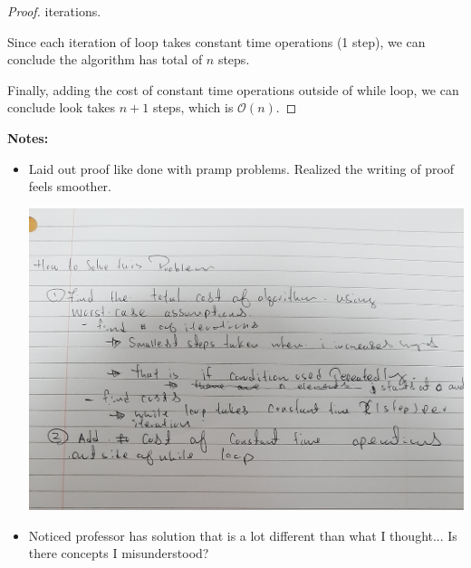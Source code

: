 \documentclass[12pt]{article}
\begin{document}
\begin{enumerate}[a.]
\begin{proof}
        iterations.

        \bigskip

        Since each iteration of loop takes constant time operations (1 step),
        we can conclude the algorithm has total of $n$ steps.

        \bigskip

        Finally, adding the cost of constant time operations outside of while loop,
        we can conclude look takes $n+1$ steps, which is $\mathcal{O}(n)$.
    \end{proof}

    \bigskip

    \textbf{Notes:}

    \begin{itemize}
        \item Laid out proof like done with pramp problems. Realized the writing
        of proof feels smoother.

        \begin{center}
        \includegraphics[width=\linewidth]{images/problem_set_4_comments_1.jpg}
        \end{center}

        \item Noticed professor has solution that is a lot different
        than what I thought... Is there concepts I misunderstood?
    \end{itemize}


\end{enumerate}
\end{document}
